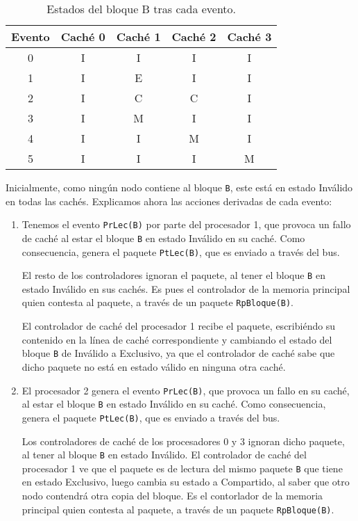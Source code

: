 \begin{ejercicio}
\begin{table}
\centering
\begin{tabular}{c|c|c|c|c}
    Evento & Caché 0 & Caché 1 & Caché 2 & Caché 3 \\
    \hline
    0 & I & I & I & I \\
    \hline
    1 & I & E & I & I \\
    \hline
    2 & I & C & C & I \\
    \hline
    3 & I & M & I & I \\
    \hline
    4 & I & I & M & I \\
    \hline
    5 & I & I & I & M \\
\end{tabular}
\caption{Estados del bloque B tras cada evento.}
\label{tab:ej_rel3_1}
\end{table}
Inicialmente, como ningún nodo contiene al bloque \verb|B|, este está en estado Inválido en todas las cachés. Explicamos ahora las acciones derivadas de cada evento:
\begin{enumerate}
    \item Tenemos el evento \verb|PrLec(B)| por parte del procesador 1, que provoca un fallo de caché al estar el bloque \verb|B| en estado Inválido en su caché. Como consecuencia, genera el paquete \verb|PtLec(B)|, que es enviado a través del bus.

        El resto de los controladores ignoran el paquete, al tener el bloque \verb|B| en estado Inválido en sus cachés. Es pues el controlador de la memoria principal quien contesta al paquete, a través de un paquete \verb|RpBloque(B)|.

        El controlador de caché del procesador 1 recibe el paquete, escribiéndo su contenido en la línea de caché correspondiente y cambiando el estado del bloque \verb|B| de Inválido a Exclusivo, ya que el controlador de caché sabe que dicho paquete no está en estado válido en ninguna otra caché.

    \item El procesador 2 genera el evento \verb|PrLec(B)|, que provoca un fallo en su caché, al estar el bloque \verb|B| en estado Inválido en su caché. Como consecuencia, genera el paquete \verb|PtLec(B)|, que es enviado a través del bus.

        Los controladores de caché de los procesadores 0 y 3 ignoran dicho paquete, al tener al bloque \verb|B| en estado Inválido. El controlador de caché del procesador 1 ve que el paquete es de lectura del mismo paquete \verb|B| que tiene en estado Exclusivo, luego cambia su estado a Compartido, al saber que otro nodo contendrá otra copia del bloque. Es el contorlador de la memoria principal quien contesta al paquete, a través de un paquete \verb|RpBloque(B)|.


\end{enumerate}
\end{ejercicio}
